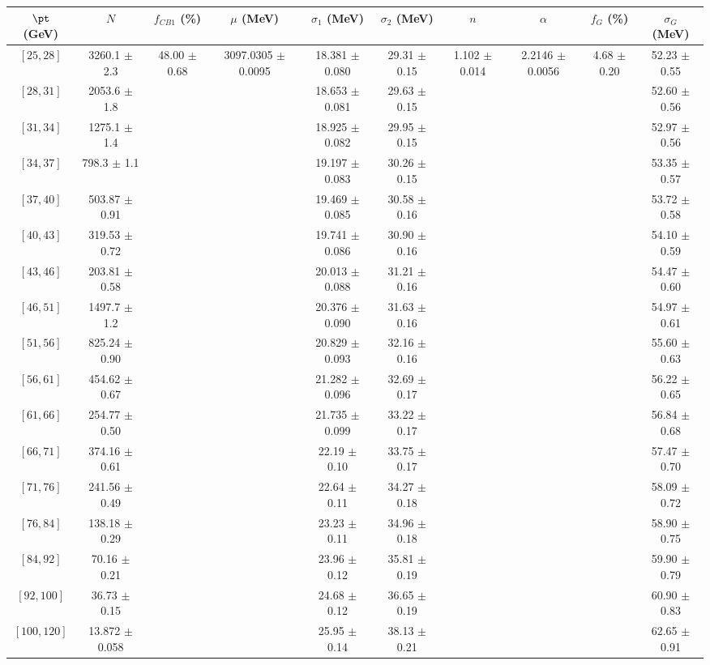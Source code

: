 \begin{tabular}{c||c|c|c|c|c|c|c|c|c}
$\pt$ (GeV) & $N$ & $f_{CB1}$ (\%)  & $\mu$ (MeV) & $\sigma_1$ (MeV) & $\sigma_2$ (MeV) & $n$ & $\alpha$ & $f_G$ (\%) & $\sigma_G$ (MeV) \\
\hline
$[25, 28]$ & 3260.1 $\pm$ 2.3 & \multirow{17}{*}{48.00 $\pm$ 0.68} & \multirow{17}{*}{3097.0305 $\pm$ 0.0095} & 18.381 $\pm$ 0.080 & 29.31 $\pm$ 0.15 & \multirow{17}{*}{1.102 $\pm$ 0.014} & \multirow{17}{*}{2.2146 $\pm$ 0.0056} & \multirow{17}{*}{4.68 $\pm$ 0.20} & 52.23 $\pm$ 0.55\\
$[28, 31]$ & 2053.6 $\pm$ 1.8 &  &  & 18.653 $\pm$ 0.081 & 29.63 $\pm$ 0.15 &  &  &  & 52.60 $\pm$ 0.56\\
$[31, 34]$ & 1275.1 $\pm$ 1.4 &  &  & 18.925 $\pm$ 0.082 & 29.95 $\pm$ 0.15 &  &  &  & 52.97 $\pm$ 0.56\\
$[34, 37]$ & 798.3 $\pm$ 1.1 &  &  & 19.197 $\pm$ 0.083 & 30.26 $\pm$ 0.15 &  &  &  & 53.35 $\pm$ 0.57\\
$[37, 40]$ & 503.87 $\pm$ 0.91 &  &  & 19.469 $\pm$ 0.085 & 30.58 $\pm$ 0.16 &  &  &  & 53.72 $\pm$ 0.58\\
$[40, 43]$ & 319.53 $\pm$ 0.72 &  &  & 19.741 $\pm$ 0.086 & 30.90 $\pm$ 0.16 &  &  &  & 54.10 $\pm$ 0.59\\
$[43, 46]$ & 203.81 $\pm$ 0.58 &  &  & 20.013 $\pm$ 0.088 & 31.21 $\pm$ 0.16 &  &  &  & 54.47 $\pm$ 0.60\\
$[46, 51]$ & 1497.7 $\pm$ 1.2 &  &  & 20.376 $\pm$ 0.090 & 31.63 $\pm$ 0.16 &  &  &  & 54.97 $\pm$ 0.61\\
$[51, 56]$ & 825.24 $\pm$ 0.90 &  &  & 20.829 $\pm$ 0.093 & 32.16 $\pm$ 0.16 &  &  &  & 55.60 $\pm$ 0.63\\
$[56, 61]$ & 454.62 $\pm$ 0.67 &  &  & 21.282 $\pm$ 0.096 & 32.69 $\pm$ 0.17 &  &  &  & 56.22 $\pm$ 0.65\\
$[61, 66]$ & 254.77 $\pm$ 0.50 &  &  & 21.735 $\pm$ 0.099 & 33.22 $\pm$ 0.17 &  &  &  & 56.84 $\pm$ 0.68\\
$[66, 71]$ & 374.16 $\pm$ 0.61 &  &  & 22.19 $\pm$ 0.10 & 33.75 $\pm$ 0.17 &  &  &  & 57.47 $\pm$ 0.70\\
$[71, 76]$ & 241.56 $\pm$ 0.49 &  &  & 22.64 $\pm$ 0.11 & 34.27 $\pm$ 0.18 &  &  &  & 58.09 $\pm$ 0.72\\
$[76, 84]$ & 138.18 $\pm$ 0.29 &  &  & 23.23 $\pm$ 0.11 & 34.96 $\pm$ 0.18 &  &  &  & 58.90 $\pm$ 0.75\\
$[84, 92]$ & 70.16 $\pm$ 0.21 &  &  & 23.96 $\pm$ 0.12 & 35.81 $\pm$ 0.19 &  &  &  & 59.90 $\pm$ 0.79\\
$[92, 100]$ & 36.73 $\pm$ 0.15 &  &  & 24.68 $\pm$ 0.12 & 36.65 $\pm$ 0.19 &  &  &  & 60.90 $\pm$ 0.83\\
$[100, 120]$ & 13.872 $\pm$ 0.058 &  &  & 25.95 $\pm$ 0.14 & 38.13 $\pm$ 0.21 &  &  &  & 62.65 $\pm$ 0.91\\
\end{tabular}
